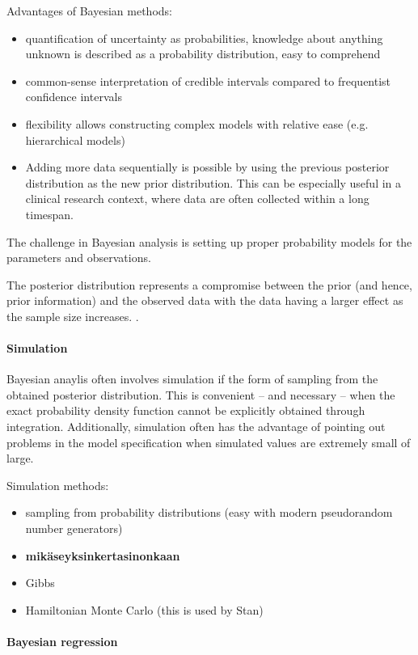 Advantages of Bayesian methods:
\begin{itemize}
\tightlist
  \item
  quantification of uncertainty as probabilities, knowledge about anything
  unknown is described as a probability distribution, easy to comprehend
  \item
  common-sense interpretation of credible intervals compared to frequentist
  confidence intervals
  \item
  flexibility allows constructing complex models with relative ease (e.g.
  hierarchical models)
  \item
  Adding more data sequentially is possible by using the previous posterior
  distribution as the new prior distribution. This can be especially useful in
  a clinical research context, where data are often collected within a long
  timespan.
\end{itemize}
The challenge in Bayesian analysis is setting up proper probability models for
the parameters and observations. \citep{Gelman2013}

The posterior distribution represents a compromise between the prior (and
hence, prior information) and the observed data with the data having a larger
effect as the sample size increases. \citep{Gelman2013}.


\paragraph{Simulation}\label{simulation}

Bayesian anaylis often involves simulation if the form of sampling from the
obtained posterior distribution. This is convenient -- and necessary -- when
the exact probability density function cannot be explicitly obtained through
integration. Additionally, simulation often has the advantage of pointing out
problems in the model specification when simulated values are extremely small
of large.

Simulation methods:
\begin{itemize}
\tightlist
  \item
  sampling from probability distributions (easy with modern pseudorandom
  number generators)
  \item
  \textbf{mikäseyksinkertasinonkaan}
  \item
  Gibbs
  \item
  Hamiltonian Monte Carlo (this is used by Stan)
\end{itemize}


\paragraph{Bayesian regression}\label{bayesian-regression}

